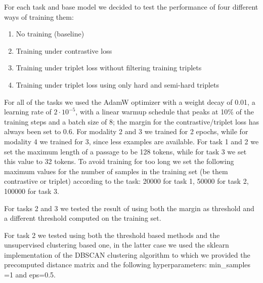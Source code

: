 \documentclass[11pt]{article}
\begin{document}
For each task and base model we decided to test the performance of four different ways of training them:
\begin{enumerate}
    \item No training (baseline)
    \item Training under contrastive loss
    \item Training under triplet loss without filtering training triplets
    \item Training under triplet loss using only hard and semi-hard triplets
\end{enumerate}

For all of the tasks we used the AdamW optimizer with a weight decay of 0.01, a learning rate of $2\cdot 10^{-5}$, with a linear warmup schedule that peaks at 10\% of the training steps and a batch size of 8; the margin for the contrastive/triplet loss has always been set to 0.6.
For modality 2 and 3 we trained for 2 epochs, while for modality 4 we trained for 3, since less examples are available.
For task 1 and 2 we set the maximum length of a passage to be 128 tokens, while for task 3 we set this value to 32 tokens.
To avoid training for too long we set the following maximum values for the number of samples in the training set (be them contrastive or triplet) according to the task: 20000 for task 1, 50000 for task 2, 100000 for task 3.

For tasks 2 and 3 we tested the result of using both the margin as threshold and a different threshold computed on the training set.

For task 2 we tested using both the threshold based methods and the unsupervised clustering based one, in the latter case we used the sklearn implementation of the DBSCAN clustering algorithm to which we provided the precomputed distance matrix and the following hyperparameters: min\_samples =1 and eps=0.5.
\end{document}
